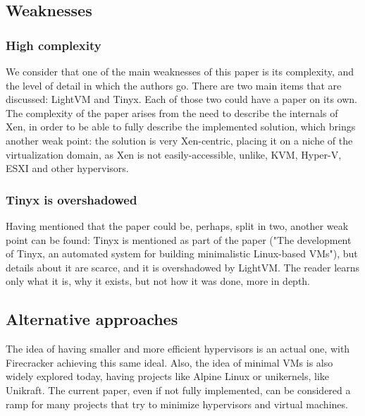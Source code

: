 \documentclass[12pt]{article}
\begin{document}
\subsection{Weaknesses}
\subsubsection{High complexity}
We consider that one of the main weaknesses of this paper is its complexity, and the level of detail in which the authors go. There are two
main items that are discussed: LightVM and Tinyx. Each of those two could have a paper on its own. The complexity of the paper arises from
the need to describe the internals of Xen, in order to be able to fully describe the implemented solution, which brings another weak point:
the solution is very Xen-centric, placing it on a niche of the virtualization domain, as Xen is not easily-accessible, unlike, KVM,
Hyper-V, ESXI and other hypervisors.

\subsubsection{Tinyx is overshadowed}
Having mentioned that the paper could be, perhaps, split in two, another weak point can be found: Tinyx is mentioned as part of the
paper ("The development of Tinyx, an automated system for building minimalistic Linux-based VMs"), but details about it are scarce,
and it is overshadowed by LightVM. The reader learns only what it is, why it exists, but not how it was done, more in depth.

\subsection{Alternative approaches}
The idea of having smaller and more efficient hypervisors is an actual one, with Firecracker achieving this same ideal. Also, the
idea of minimal VMs is also widely explored today, having projects like Alpine Linux or unikernels, like Unikraft. The current paper,
even if not fully implemented, can be considered a ramp for many projects that try to minimize hypervisors and virtual machines. 


\end{document}
